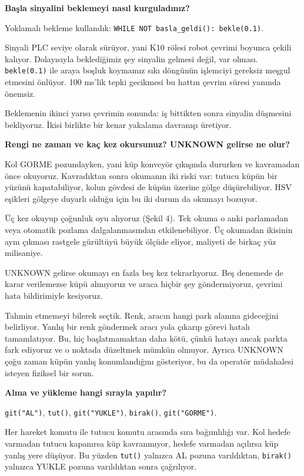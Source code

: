 \documentclass[11pt,a4paper]{article}
\newcommand{\ey}[1]{\texttt{#1}}
\begin{document}
\textbf{Başla sinyalini beklemeyi nasıl kurguladınız?}

Yoklamalı bekleme kullandık: \ey{WHILE NOT basla\_geldi(): bekle(0.1)}.

Sinyali PLC seviye olarak sürüyor, yani K10 rölesi robot çevrimi boyunca çekili
kalıyor. Dolayısıyla beklediğimiz şey sinyalin gelmesi değil, var olması.
\ey{bekle(0.1)} ile araya boşluk koymamız sıkı döngünün işlemciyi gereksiz
meşgul etmesini önlüyor. 100 ms'lik tepki gecikmesi bu hattın çevrim süresi
yanında önemsiz.

Beklemenin ikinci yarısı çevrimin sonunda: iş bittikten sonra sinyalin düşmesini
bekliyoruz. İkisi birlikte bir kenar yakalama davranışı üretiyor.

\textbf{Rengi ne zaman ve kaç kez okursunuz? UNKNOWN gelirse ne olur?}

Kol GORME pozundayken, yani küp konveyör çıkışında dururken ve kavramadan önce
okuyoruz. Kavradıktan sonra okumanın iki riski var: tutucu küpün bir yüzünü
kapatabiliyor, kolun gövdesi de küpün üzerine gölge düşürebiliyor. HSV eşikleri
gölgeye duyarlı olduğu için bu iki durum da okumayı bozuyor.

Üç kez okuyup çoğunluk oyu alıyoruz (Şekil 4). Tek okuma o anki parlamadan veya
otomatik pozlama dalgalanmasından etkilenebiliyor. Üç okumadan ikisinin aynı
çıkması rastgele gürültüyü büyük ölçüde eliyor, maliyeti de birkaç yüz
milisaniye.

UNKNOWN gelirse okumayı en fazla beş kez tekrarlıyoruz. Beş denemede de karar
verilemezse küpü almıyoruz ve araca hiçbir şey göndermiyoruz, çevrimi hata
bildirimiyle kesiyoruz.

Tahmin etmemeyi bilerek seçtik. Renk, aracın hangi park alanına gideceğini
belirliyor. Yanlış bir renk göndermek aracı yola çıkarıp görevi hatalı
tamamlatıyor. Bu, hiç başlatmamaktan daha kötü, çünkü hatayı ancak parkta fark
ediyoruz ve o noktada düzeltmek mümkün olmuyor. Ayrıca UNKNOWN çoğu zaman küpün
yanlış konumlandığını gösteriyor, bu da operatör müdahalesi isteyen fiziksel bir
sorun.

\textbf{Alma ve yükleme hangi sırayla yapılır?}

\ey{git("AL")}, \ey{tut()}, \ey{git("YUKLE")}, \ey{birak()}, \ey{git("GORME")}.

Her hareket komutu ile tutucu komutu arasında sıra bağımlılığı var. Kol hedefe
varmadan tutucu kapanırsa küp kavranmıyor, hedefe varmadan açılırsa küp yanlış
yere düşüyor. Bu yüzden \ey{tut()} yalnızca AL pozuna varıldıktan,
\ey{birak()} yalnızca YUKLE pozuna varıldıktan sonra çağrılıyor.
\end{document}
